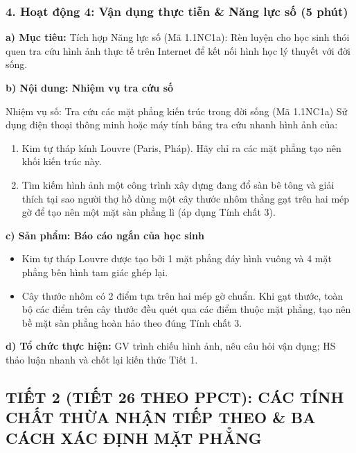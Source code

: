 \documentclass[12pt, a4paper]{article}
\begin{document}
\subsubsection*{4. Hoạt động 4: Vận dụng thực tiễn & Năng lực số (5 phút)}

\noindent \textbf{a) Mục tiêu:}
Tích hợp Năng lực số (Mã 1.1NC1a): Rèn luyện cho học sinh thói quen tra cứu hình ảnh thực tế trên Internet để kết nối hình học lý thuyết với đời sống.

\noindent \textbf{b) Nội dung: Nhiệm vụ tra cứu số}
\begin{aibox}{Nhiệm vụ số: Tra cứu các mặt phẳng kiến trúc trong đời sống (Mã 1.1NC1a)}
Sử dụng điện thoại thông minh hoặc máy tính bảng tra cứu nhanh hình ảnh của:
\begin{enumerate}[leftmargin=0.6cm]
    \item Kim tự tháp kính Louvre (Paris, Pháp). Hãy chỉ ra các mặt phẳng tạo nên khối kiến trúc này.
    \item Tìm kiếm hình ảnh một công trình xây dựng đang đổ sàn bê tông và giải thích tại sao người thợ hồ dùng một cây thước nhôm thẳng gạt trên hai mép gờ để tạo nên một mặt sàn phẳng lì (áp dụng Tính chất 3).
\end{enumerate}
\end{aibox}

\noindent \textbf{c) Sản phẩm: Báo cáo ngắn của học sinh}
\begin{itemize}[leftmargin=0.6cm]
    \item Kim tự tháp Louvre được tạo bởi 1 mặt phẳng đáy hình vuông và 4 mặt phẳng bên hình tam giác ghép lại.
    \item Cây thước nhôm có 2 điểm tựa trên hai mép gờ chuẩn. Khi gạt thước, toàn bộ các điểm trên cây thước đều quét qua các điểm thuộc mặt phẳng, tạo nên bề mặt sàn phẳng hoàn hảo theo đúng Tính chất 3.
\end{itemize}

\noindent \textbf{d) Tổ chức thực hiện:}
GV trình chiếu hình ảnh, nêu câu hỏi vận dụng; HS thảo luận nhanh và chốt lại kiến thức Tiết 1.

\newpage
\subsection*{TIẾT 2 (TIẾT 26 THEO PPCT): CÁC TÍNH CHẤT THỪA NHẬN TIẾP THEO \& BA CÁCH XÁC ĐỊNH MẶT PHẲNG}
\end{document}

